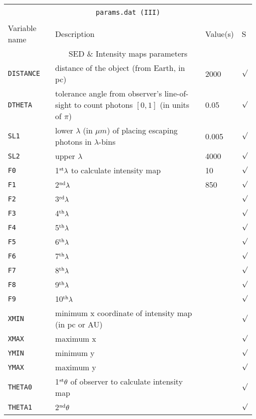 \documentclass[12pt,a4paper]{article}
\begin{document}
\vspace{1cm}

{\centering 
\begin{tabular}{|p{3.3cm}|p{10.4cm}|p{2.5cm}|p{0.3cm}|}
\hline
\multicolumn{4}{|c|}{}\\ 
\multicolumn{4}{|c|}{\large \texttt{params.dat (III)} }\\ 
\multicolumn{4}{|c|}{}\\ 
\hline
Variable name & Description & Value(s) & S \\
\hline
\multicolumn{4}{|c|}{SED \& Intensity maps parameters}\\
\hline
\texttt{DISTANCE} & distance of the object (from Earth, in pc) &  2000 &$\surd$ \\
\texttt{DTHETA} & tolerance angle from observer's line-of-sight to count photons $[0,1]$ 
(in units of $\pi$)& 0.05 & $\surd$\\
\texttt{SL1} & lower $\lambda$ (in $\mu m$) of placing escaping photons in $\lambda$-bins& 0.005 & $\surd$\\
\texttt{SL2} & upper $\lambda$ & 4000 & $\surd$\\
\texttt{F0} & 1$^{\rm st} \lambda$ to calculate intensity map & 10& $\surd$\\
\texttt{F1} & 2$^{\rm nd} \lambda$ & 850 & $\surd$\\
\texttt{F2} & 3$^{\rm rd} \lambda$ & & $\surd$\\
\texttt{F3} & 4$^{\rm th} \lambda$ & & $\surd$\\
\texttt{F4} & 5$^{\rm th} \lambda$ & & $\surd$\\
\texttt{F5} & 6$^{\rm th} \lambda$ & & $\surd$\\
\texttt{F6} & 7$^{\rm th} \lambda$ & & $\surd$\\
\texttt{F7} & 8$^{\rm th} \lambda$ & & $\surd$\\
\texttt{F8} & 9$^{\rm th} \lambda$ & & $\surd$\\
\texttt{F9} & 10$^{\rm th} \lambda$ & & $\surd$\\
\texttt{XMIN} & minimum x coordinate of intensity map (in pc or AU)& & $\surd$\\
\texttt{XMAX} & maximum x& & $\surd$\\
\texttt{YMIN} & minimum  y& & $\surd$\\
\texttt{YMAX} & maximum y& & $\surd$\\
\texttt{THETA0} & 1$^{\rm st} \theta$ of observer to calculate intensity map& &$\surd$\\
\texttt{THETA1} & 2$^{\rm nd}\theta$& & $\surd$\\

\end{tabular}}
\end{document}

